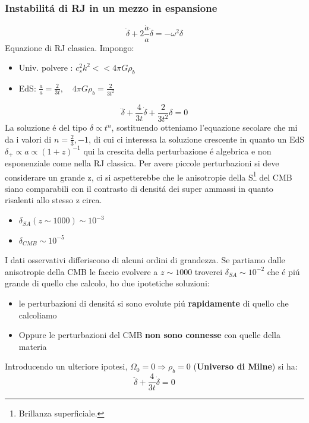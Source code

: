 \documentclass[12pt, a4paper]{article}
\begin{document}
\subsubsection{Instabilit\'{a} di RJ in un mezzo in espansione}
\begin{equation}
\ddot{\delta}+2\frac{\dot{a}}{a}\dot{\delta}=-\omega^2 \delta
\label{eq:rjexp}
\end{equation}
Equazione di RJ classica. Impongo:
\begin{itemize}
\item Univ. polvere : $c_s^2k^2<<4\pi G\rho_b$
\item EdS: $\frac{\dot{a}}{a}=\frac{2}{3t}, \quad 4\pi G\rho_b=\frac{2}{3t^2}$
\end{itemize}
\begin{equation}
\ddot{\delta}+\frac{4}{3t}\dot{\delta}+ \frac{2}{3t^2}\delta=0
\end{equation}
La soluzione \'{e} del tipo $\delta \propto t^n$, sostituendo otteniamo l'equazione secolare che mi da i valori di $n=\frac{2}{3}, -1$, di cui ci interessa la soluzione crescente in quanto un EdS $\delta_+\propto a\propto (1+z)^{-1}$ qui la crescita della perturbazione \'{e} algebrica e non esponenziale come nella RJ classica. Per avere piccole perturbazioni si deve considerare un grande z, ci si aspetterebbe che le anisotropie della S\footnote{Brillanza superficiale.} del CMB siano comparabili con il contrasto di densit\'{a}  dei super ammassi in quanto risalenti allo stesso z circa. 
\begin{itemize}
\item $\delta_{SA}(z\sim 1000)\sim 10^{-3}$
\item $\delta_{CMB}\sim 10^{-5}$
\end{itemize}
I dati osservativi differiscono di alcuni ordini di grandezza. Se partiamo dalle anisotropie della CMB le faccio evolvere a $z\sim 1000$ troverei $\delta_{SA} \sim 10^{-2}$ che \'{e} pi\'{u} grande di 	quello che calcolo, ho due ipotetiche soluzioni:
\begin{itemize}
\item le perturbazioni di densit\'{a} si sono evolute pi\'{u} \textbf{rapidamente} di quello che calcoliamo
\item Oppure le perturbazioni del CMB \textbf{non sono connesse} con quelle della materia
\end{itemize}
Introducendo un ulteriore ipotesi, $\Omega_0=0\Rightarrow \rho_b=0$ (\textbf{Universo di Milne}) si ha:
\begin{equation}
\ddot{\delta}+\frac{4}{3t}\dot{\delta}=0
\end{equation}
\end{document}
